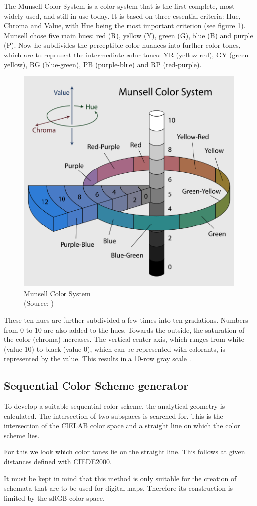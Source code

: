 The Munsell Color System is a color system that is the first complete, most widely used, and still in use today. It is based on three essential criteria: Hue, Chroma and Value, with Hue being the most important criterion (see figure \ref{fig:munsell}). Munsell chose five main hues: red (R), yellow (Y), green (G), blue (B) and purple (P). Now he subdivides the perceptible color nuances into further color tones, which are to represent the intermediate color tones: YR (yellow-red), GY (green-yellow), BG (blue-green), PB (purple-blue) and RP (red-purple).
\begin{figure}
	\centering
	\includegraphics[width=0.4\linewidth]{source/images/munsell}
	\caption{Munsell Color System \\
		(Source: \textcite{munsell2007})}
	\label{fig:munsell}
\end{figure}
These ten hues are further subdivided a few times into ten gradations. Numbers from 0 to 10 are also added to the hues. Towards the outside, the saturation of the color (chroma) increases. The vertical center axis, which ranges from white (value 10) to black (value 0), which can be represented with colorants, is represented by the value. This results in a 10-row gray scale \parencite{munsell1915}.

\subsection{Sequential Color Scheme generator}
To develop a suitable sequential color scheme, the analytical geometry is calculated. The intersection of two subspaces is searched for. This is the intersection of the CIELAB color space and a straight line on which the color scheme lies.

For this we look which color tones lie on the straight line. This follows at given distances defined with CIEDE2000. 

It must be kept in mind that this method is only suitable for the creation of schemata that are to be used for digital maps. Therefore its construction is limited by the sRGB color space. 

